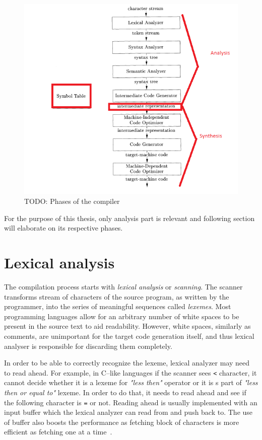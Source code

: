 \documentclass[
  digital, %
  table,   %
  lof,     %
  lot,     %
  oneside,
]{fithesis3}
\begin{document}
\begin{figure}[h!]
		\centering
			\includegraphics[scale=0.6]{img/compiler-phases}
		\caption{TODO: Phases of the compiler~\cite{dragon-book}}
		\label{fig:compiler-phases}
\end{figure}

For the purpose of this thesis, only analysis part is relevant and following section will elaborate on its respective phases.

  \section{Lexical analysis}
The compilation process starts with \textit{lexical analysis} or \textit{scanning}. The scanner transforms stream of characters of the source program, as written by the programmer, into the series of meaningful sequences called \textit{lexemes}. Most programming languages allow for an arbitrary number of white spaces to be present in the source text to aid readability. However, white spaces, similarly as comments, are unimportant for the target code generation itself, and thus lexical analyser is responsible for discarding them completely.

In order to be able to correctly recognize the lexeme, lexical analyzer may need to read ahead. For example, in C--like languages if the scanner sees \texttt{<} character, it cannot decide whether it is a lexeme for \textit{"less then"} operator or it is s part of \textit{"less then or equal to"} lexeme. In order to do that, it needs to read ahead and see if the following character is \texttt{=} or not. Reading ahead is usually implemented with an input buffer which the lexical analyzer can read from and push back to. The use of buffer also boosts the performance as fetching block of characters is more efficient as fetching one at a time~\cite{dragon-book}.
\end{document}
